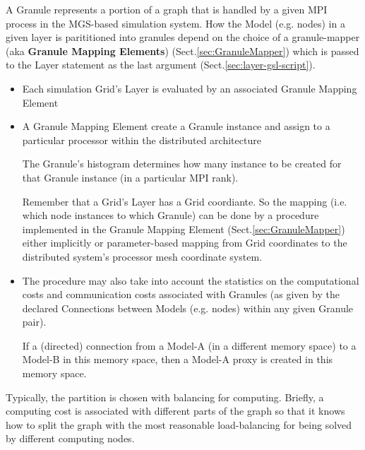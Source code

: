 A Granule represents a portion of a graph that is handled by a given MPI process
in the MGS-based simulation system.  How the Model (e.g. nodes) in a given layer
is parititioned into granules depend on the choice of a granule-mapper (aka {\bf
Granule Mapping Elements}) (Sect.\ref{sec:GranuleMapper}) which is passed to the
Layer statement as the last argument (Sect.\ref{sec:layer-gsl-script}).
\begin{itemize}
  
  \item Each simulation Grid's Layer is evaluated by an associated Granule
  Mapping Element
  
  \item A Granule Mapping Element create a Granule instance and assign to a
  particular processor within the distributed architecture
  
  The Granule's histogram determines how many instance to be created for that
  Granule instance (in a particular MPI rank).
  
  Remember that a Grid's Layer has a Grid coordiante. So
  the mapping (i.e. which node instances to which Granule) can be done by a
  procedure implemented in the Granule Mapping Element (Sect.\ref{sec:GranuleMapper})
  either implicitly or parameter-based mapping from Grid coordinates to the
  distributed system's processor mesh coordinate system.
  
  \item The procedure may also take into account the statistics on the
  computational costs and communication costs associated with Granules (as
  given by the declared Connections between Models (e.g. nodes) within any
  given Granule pair). 
  
  If a (directed) connection from a Model-A (in a different memory space) to a
  Model-B in this memory space, then a Model-A proxy is created in this memory
  space.
\end{itemize}

Typically, the partition is chosen with balancing for computing.
Briefly, a computing cost is associated with different parts of the graph so
that it knows how to split the graph with the most reasonable load-balancing for
being solved by different computing nodes.

